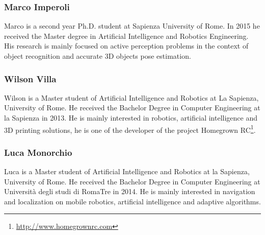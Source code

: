 \documentclass{llncs}
\begin{document}
\subsubsection*{Marco Imperoli}
Marco is a second year Ph.D. student at Sapienza University of Rome. 
In 2015 he received the Master degree in Artificial Intelligence and Robotics Engineering. 
His research is mainly focused on active perception problems in the context of object recognition and accurate 3D objects pose estimation. 



\subsubsection*{Wilson Villa}
Wilson is a Master student of Artificial Intelligence and Robotics at La Sapienza, University of Rome. 
He received the Bachelor Degree in Computer Engineering at la Sapienza in 2013. 
He is mainly interested in robotics, artificial intelligence and 3D printing solutions, he is one of the developer of the project Homegrown RC\footnote{\url{http://www.homegrownrc.com}}.

\subsubsection*{Luca Monorchio}
Luca is a Master student of Artificial Intelligence and Robotics at la Sapienza, University of Rome. He received the Bachelor Degree in Computer Engineering at Università degli studi di RomaTre in 2014. He is mainly interested in navigation and localization on mobile robotics, artificial intelligence and adaptive algorithms.
\end{document}
